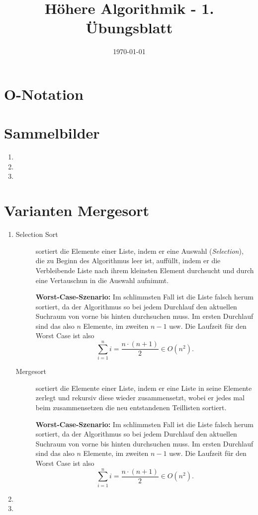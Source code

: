 \documentclass[a4paper,10pt]{scrartcl}
\title{Höhere Algorithmik - 1. Übungsblatt}
\author{\Authors}
\date{\today}
\begin{document}
\maketitle

\section{$\boldsymbol{O}$-Notation}
\section{Sammelbilder}
\begin{enumerate}
\item 
\item 
\item 
\end{enumerate}

\section{Varianten Mergesort}
\begin{enumerate}
\item \begin{description}
       \item[Selection Sort] sortiert die Elemente einer Liste, indem er eine
Auswahl (\textit{Selection}), die zu Beginn des Algorithmus leer ist, auffüllt,
indem er die Verbleibende Liste nach ihrem kleinsten Element durchsucht und
durch eine Vertauschun in die Auswahl aufnimmt.

\textbf{Worst-Case-Szenario:} Im schlimmsten Fall ist die Liste falsch
herum sortiert, da der Algorithmus so bei jedem Durchlauf den aktuellen
Suchraum von vorne bis hinten durchsuchen muss. Im ersten Durchlauf sind das
also $n$ Elemente, im zweiten $n-1$ usw. Die Laufzeit für den Worst Case ist
also
\[
 \sum\limits_{i = 1}^{n} i = \frac{n \cdot (n + 1)}{2} \in O(n^2).
\]


       \item[Mergesort] sortiert die Elemente einer Liste, indem er eine Liste
in seine Elemente zerlegt und rekursiv diese wieder zusammensetzt, wobei er
jedes mal beim zusammensetzen die neu entstandenen Teillisten sortiert.

\textbf{Worst-Case-Szenario:} Im schlimmsten Fall ist die Liste falsch
herum sortiert, da der Algorithmus so bei jedem Durchlauf den aktuellen
Suchraum von vorne bis hinten durchsuchen muss. Im ersten Durchlauf sind das
also $n$ Elemente, im zweiten $n-1$ usw. Die Laufzeit für den Worst Case ist
also
\[
 \sum\limits_{i = 1}^{n} i = \frac{n \cdot (n + 1)}{2} \in O(n^2).
\]
      \end{description}
\item 
\item 
\end{enumerate}
\end{document}
